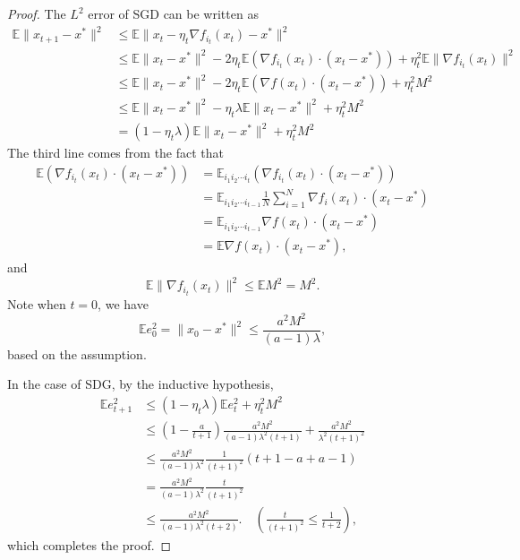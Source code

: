 \begin{proof}
The $L^2$ error of SGD can be written as
\begin{equation}
      \label{equ:L2SGD}
      \begin{split}
            \mathbb{E} \|x_{t+1} - x^*\|^2 &\le \mathbb{E}\| x_{t} - \eta_t \nabla f_{i_t}(x_t) - x^* \|^2 \\
            &\le \mathbb{E} \|x_t - x^*\|^2 
            - 2 \eta_t \mathbb{E} (\nabla f_{i_t}(x_t) \cdot (x_t - x^*)) 
            + \eta_t^2 \mathbb{E} \|\nabla f_{i_t}(x_t)\|^2 \\
            & \le \mathbb{E} \|x_t - x^*\|^2 - 2 \eta_t \mathbb{E} (\nabla f (x_t) \cdot (x_t - x^*))
            + \eta_t^2 M^2 \\
            & \le \mathbb{E} \|x_t - x^*\|^2 -  \eta_t \lambda \mathbb{E} \|x_t - x^*\|^2 + \eta_t^2 M^2 \\
            & = (1 - \eta_t\lambda) \mathbb{E} \|x_t - x^*\|^2 + \eta_t^2 M^2
      \end{split}
\end{equation}
The third line comes from the fact that
\begin{equation}\label{key}
\begin{aligned}
\mathbb{E} (\nabla f_{i_t}(x_t) \cdot (x_t - x^*))  &= \mathbb{E}_{i_1i_2\cdots i_t} (\nabla f_{i_t}(x_t) \cdot (x_t - x^*)) \\
&= \mathbb{E}_{i_1i_2\cdots i_{t-1}} \frac{1}{N} \sum_{i=1}^N \nabla f_i(x_t)\cdot (x_t - x^*) \\
&= \mathbb{E}_{i_1i_2\cdots i_{t-1}}  \nabla f(x_t)\cdot (x_t - x^*) \\
&= \mathbb{E}\nabla f(x_t)\cdot (x_t - x^*),
\end{aligned}
\end{equation}
and
\begin{equation}
\mathbb{E} \|\nabla f_{i_t}(x_t)\|^2 \le \mathbb{E} M^2 = M^2.
\end{equation}
Note when $t=0$, we have 
\begin{equation}\label{key}
\mathbb{E} e_0^2 = \|x_0 - x^*\|^2 \le \frac{a^2M^2}{(a-1)\lambda},
\end{equation}
based on the assumption.

In the case of SDG, by the inductive hypothesis, 
\begin{equation}
      \begin{split}
            \mathbb{E}e_{t+1}^2 & \le (1 - \eta_t\lambda)\mathbb{E}e_{t}^2  + \eta_t^2 M^2\\
            &\le  (1 - \frac{a}{t+1}) \frac{a^2M^2}{(a-1)\lambda^2 (t+1)} + \frac{a^2M^2}{\lambda^2 (t+1)^2} \\
            & \le \frac{a^2M^2}{(a-1)\lambda^2} \frac{1}{(t+1)^2}(t+1 -a + a-1) \\
            & = \frac{a^2M^2}{(a-1)\lambda^2} \frac{t}{(t+1)^2} \\
            & \le \frac{a^2M^2}{(a-1)\lambda^2(t+2)}. \quad \left(\frac{t}{(t+1)^2} \le \frac{1}{t+2}\right),
      \end{split}
\end{equation}
which completes the proof.
\end{proof}


